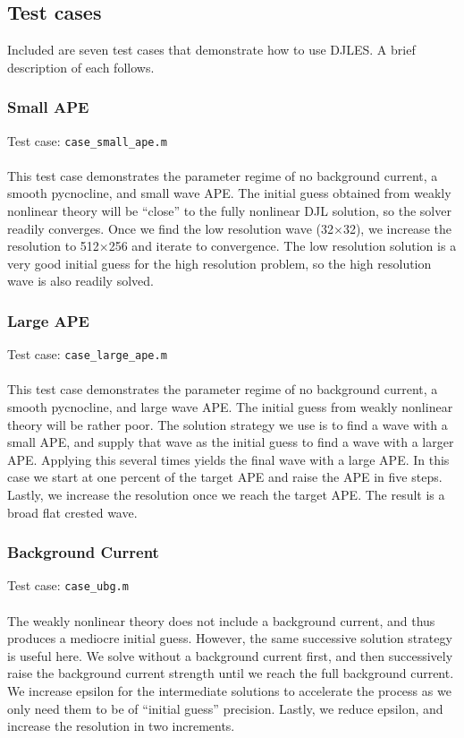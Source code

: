 \documentclass[letterpaper]{article}
\begin{document}
\subsection{Test cases}
Included are seven test cases that demonstrate how to use DJLES. A brief description of each follows.

\subsubsection{Small APE}
Test case: \verb"case_small_ape.m" \\\\
This test case demonstrates the parameter regime of no background current, a smooth pycnocline, and small wave APE.
The initial guess obtained from weakly nonlinear theory will be ``close'' to the fully nonlinear DJL solution, so the solver readily converges.
Once we find the low resolution wave (32$\times$32), we increase the resolution to 512$\times$256 and iterate to convergence.
The low resolution solution is a very good initial guess for the high resolution problem, so the high resolution wave is also readily solved.

\subsubsection{Large APE}
Test case: \verb"case_large_ape.m" \\\\
This test case demonstrates the parameter regime of no background current, a smooth pycnocline, and large wave APE.
The initial guess from weakly nonlinear theory will be rather poor. 
The solution strategy we use is to find a wave with a small APE, and supply that wave as the initial guess to find a wave with a larger APE.
Applying this several times yields the final wave with a large APE.
In this case we start at one percent of the target APE and raise the APE in five steps.
Lastly, we increase the resolution once we reach the target APE.
The result is a broad flat crested wave.

\subsubsection{Background Current}
Test case: \verb"case_ubg.m" \\\\
The weakly nonlinear theory does not include a background current, and thus produces a mediocre initial guess.
However, the same successive solution strategy is useful here.
We solve without a background current first, and then successively raise the background current strength until we reach the full background current.
We increase epsilon for the intermediate solutions to accelerate the process as we only need them to be of ``initial guess'' precision.
Lastly, we reduce epsilon, and increase the resolution in two increments.
\end{document}
